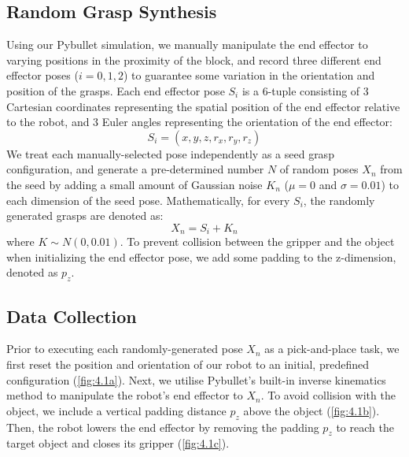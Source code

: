 \documentclass[12pt, a4paper]{report}
\theoremstyle{definition}
\begin{document}
\subsection{Random Grasp Synthesis}
\label{sec:4.1.1}
Using our Pybullet simulation, we manually manipulate the end effector to varying positions in the proximity of the block, and record three different end effector poses ($i=0,1,2$) to guarantee some variation in the orientation and position of the grasps. Each end effector pose $S_i$ is a 6-tuple consisting of 3 Cartesian coordinates representing the spatial position of the end effector relative to the robot, and 3 Euler angles representing the orientation of the end effector:
\begin{equation}
    S_i=(x,y,z,r_x,r_y,r_z)
\end{equation}
We treat each manually-selected pose independently as a seed grasp configuration, and generate a pre-determined number $N$ of random poses $X_n$ from the seed by adding a small amount of Gaussian noise $K_n$ ($\mu=0$ and $\sigma=0.01$) to each dimension of the seed pose. Mathematically, for every $S_i$, the randomly generated grasps are denoted as:
\begin{equation}
    X_n=S_i+K_n
\end{equation}
where $K\sim N(0,0.01)$. To prevent collision between the gripper and the object when initializing the end effector pose, we add some padding to the z-dimension, denoted as $p_z$.

\subsection{Data Collection}
\label{sec:4.1.2}
Prior to executing each randomly-generated pose $X_n$ as a pick-and-place task, we first reset the position and orientation of our robot to an initial, predefined configuration (\ref{fig:4.1a}). Next, we utilise Pybullet's built-in inverse kinematics method to manipulate the robot's end effector to $X_n$. To avoid collision with the object, we include a vertical padding distance $p_z$ above the object (\ref{fig:4.1b}). Then, the robot lowers the end effector by removing the padding $p_z$ to reach the target object and closes its gripper (\ref{fig:4.1c}).
\end{document}

